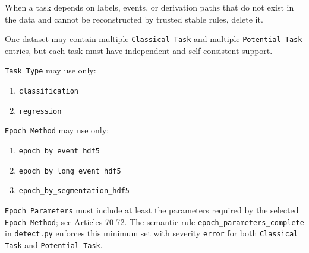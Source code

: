 \begin{tcolorbox}
\smallskip{}\par\smallskip

\noindent When a task depends on labels, events, or derivation paths that do not exist in the data and cannot be reconstructed by trusted stable rules, delete it.\par\smallskip

\smallskip{}\par\smallskip

\noindent One dataset may contain multiple \texttt{Classical Task} and multiple \texttt{Potential Task} entries, but each task must have independent and self-consistent support.\par\smallskip

\smallskip{}\par\smallskip

\noindent \texttt{Task Type} may use only:\par\smallskip

\begin{enumerate}[leftmargin=1.5em,noitemsep,topsep=2pt]
\item \texttt{classification}
\item \texttt{regression}
\end{enumerate}

\smallskip{}\par\smallskip

\noindent \texttt{Epoch Method} may use only:\par\smallskip

\begin{enumerate}[leftmargin=1.5em,noitemsep,topsep=2pt]
\item \texttt{epoch\_by\_event\_hdf5}
\item \texttt{epoch\_by\_long\_event\_hdf5}
\item \texttt{epoch\_by\_segmentation\_hdf5}
\end{enumerate}

\smallskip{}\par\smallskip

\noindent \texttt{Epoch Parameters} must include at least the parameters required by the selected \texttt{Epoch Method}; see Articles 70-72. The semantic rule \texttt{epoch\_parameters\_complete} in \texttt{detect.py} enforces this minimum set with severity \texttt{error} for both \texttt{Classical Task} and \texttt{Potential Task}.\par\smallskip


\end{tcolorbox}

